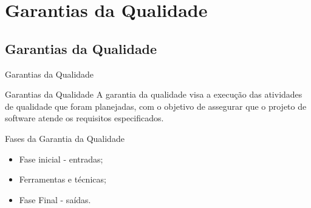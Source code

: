 \documentclass[xcolor=x11names,compress]{beamer}
\begin{document}
\section{Garantias da Qualidade}
\subsection{Garantias da Qualidade}

\begin{frame}{Garantias da Qualidade}

\begin{alertblock}{Garantias da Qualidade}
A garantia da qualidade visa a execução das atividades de qualidade que foram planejadas, com o objetivo de assegurar que o projeto de software atende os requisitos especificados.
\end{alertblock}

\end{frame}

\begin{frame}{Fases da Garantia da Qualidade}

\begin{itemize}
\itemsep 5mm
\item Fase inicial - entradas;

\item Ferramentas e técnicas;

\item Fase Final - saídas.

\end{itemize}

\end{frame}
\end{document}
